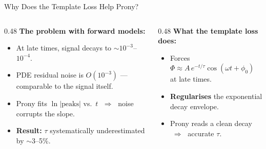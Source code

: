 \documentclass[aspectratio=169, 11pt]{beamer}
\begin{document}
\begin{frame}{Why Does the Template Loss Help Prony?}
  \begin{columns}[T]
    \begin{column}{0.48\textwidth}
      \textbf{The problem with forward models:}
      \begin{itemize}
        \item At late times, signal decays to $\sim\!10^{-3}$--$10^{-4}$.
        \item PDE residual noise is $O(10^{-3})$ ---
              comparable to the signal itself.
        \item Prony fits $\ln|\text{peaks}|$ vs.\ $t$
              $\;\Rightarrow\;$ noise corrupts the slope.
        \item \textbf{Result:} $\tau$ systematically underestimated
              by $\sim$3--5\%.
      \end{itemize}
    \end{column}
    \begin{column}{0.48\textwidth}
      \textbf{What the template loss does:}
      \begin{itemize}
        \item Forces $\Phi \approx A\,e^{-t/\tau}\cos(\omega t + \phi_0)$
              at late times.
        \item \textbf{Regularises} the exponential decay envelope.
        \item Prony reads a clean decay $\;\Rightarrow\;$ accurate $\tau$.
      \end{itemize}
    \end{column}
  \end{columns}
\end{frame}
\end{document}
